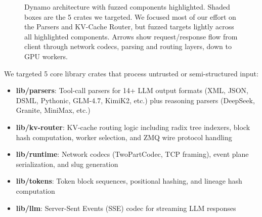 \documentclass[11pt]{article}
\begin{document}
\begin{figure}[H]
\caption{Dynamo architecture with fuzzed components highlighted. Shaded boxes are the 5 crates we targeted. We focused most of our effort on the Parsers and KV-Cache Router, but fuzzed targets lightly across all highlighted components. Arrows show request/response flow from client through network codecs, parsing and routing layers, down to GPU workers.}
\label{fig:architecture}
\end{figure}

We targeted 5 core library crates that process untrusted or semi-structured input:

\begin{itemize}[nosep]
    \item \textbf{lib/parsers}: Tool-call parsers for 14+ LLM output formats (XML, JSON, DSML, Pythonic, GLM-4.7, KimiK2, etc.) plus reasoning parsers (DeepSeek, Granite, MiniMax, etc.)
    \item \textbf{lib/kv-router}: KV-cache routing logic including radix tree indexers, block hash computation, worker selection, and ZMQ wire protocol handling
    \item \textbf{lib/runtime}: Network codecs (TwoPartCodec, TCP framing), event plane serialization, and slug generation
    \item \textbf{lib/tokens}: Token block sequences, positional hashing, and lineage hash computation
    \item \textbf{lib/llm}: Server-Sent Events (SSE) codec for streaming LLM responses
\end{itemize}
\end{document}
